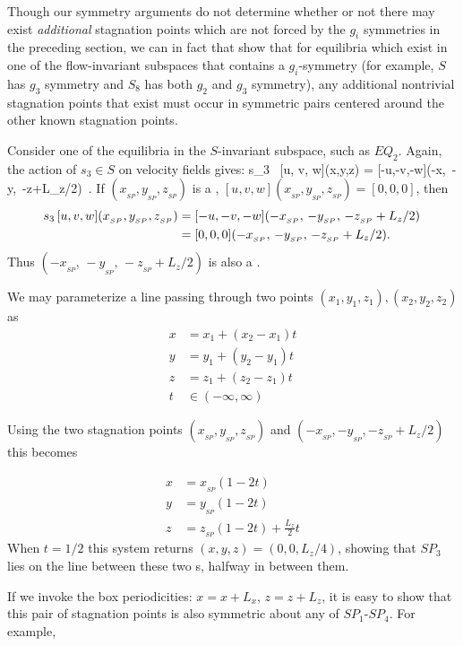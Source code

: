 \documentclass[letter,12pt,openany]{article}
\begin{document}
Though our symmetry arguments do not determine whether or not there may exist \textit{additional} stagnation points which are not forced by the $g_i$ symmetries in the preceding section, we can in fact that show that for equilibria which exist in one of the flow-invariant subspaces that contains a $g_i$-symmetry (for example, $S$ has $g_3$ symmetry and $S_8$ has both $g_2$ and $g_3$ symmetry), any additional nontrivial stagnation points that exist must occur in symmetric pairs centered around the other known stagnation points.

Consider one of the equilibria in the $S$-invariant subspace, such as $EQ_2$. Again, the
 action of $s_3 \in S$ on velocity fields gives:
 \beq    s_3 \, [u, v, w](x,y,z) = [-u,-v,-w](-x,\, -y,\, -z+L_z/2)\nnu\, .
 \eeq
 If $(x_{_{SP}},y_{_{SP}},z_{_{SP}})$ is a \stagp, $[u, v,
 w](x_{_{SP}},y_{_{SP}},z_{_{SP}}) = [0,0,0]$, then
 \begin{align} s_3 \, [u, v, w](x_{_{SP}},y_{_{SP}},z_{_{SP}}) &= [-u,-v,-w](-x_{_{SP}},\, -y_{_{SP}},\, -z_{_{SP}}+L_z/2) \nonumber\, \\
 &= [0,0,0](-x_{_{SP}},\, -y_{_{SP}},\, -z_{_{SP}}+L_z/2) .
 \end{align}
 Thus $(-x_{_{SP}},\, -y_{_{SP}},\, -z_{_{SP}}+L_z/2)$ is also a \stagp.


 \noindent We may parameterize a line passing through two points $(x_{1}, y_{1}, z_{1}),(x_{2}, y_{2}, z_{2})$
 as
 \begin{align}
  x &= x_{1} + (x_{2} - x_{1})t \\
  y &= y_{1} + (y_{2} - y_{1})t \\
  z &= z_{1} + (z_{2} - z_{1})t \\
  t &\in (-\infty,\infty)
 \end{align}
 
 Using the two stagnation points $(x_{_{SP}},y_{_{SP}},z_{_{SP}})$ and $(-x_{_{SP}},-y_{_{SP}},-z_{_{SP}} + L_z/2)$ this becomes
 
 \begin{align}
  x &= x_{_{SP}}(1-2t) \\
  y &= y_{_{SP}}(1-2t) \\
  z &= z_{_{SP}}(1-2t) + \frac{L_{z}}{2} t
 \end{align}
 When $t = 1/2$ this system returns $(x,y,z) = (0,0,L_{z}/4)$, showing
 that $SP_3$ lies on the line between these two \stagp s, halfway
 in between them.

 If we invoke the box periodicities: $x = x + L_{x}$, $z = z +
 L_{z}$, it is easy to show that this pair of stagnation points is also symmetric
 about any of $SP_1$-$SP_4$. For example, \\
\end{document}
